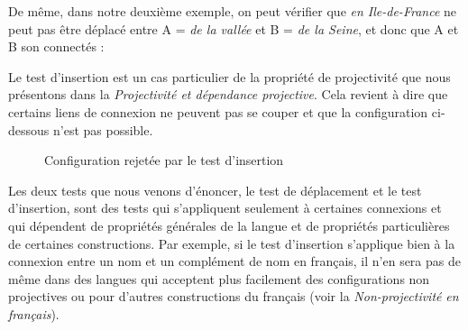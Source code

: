 De même, dans notre deuxième exemple, on peut vérifier que \textit{en Ile-de-France} ne peut pas être déplacé entre A = \textit{de la vallée} et B = \textit{de la Seine}, et donc que A et B son connectés :

\z
Le test d’insertion est un cas particulier de la propriété de projectivité que nous présentons dans la  \textit{Projectivité et dépendance projective}. Cela revient à dire que certains liens de connexion ne peuvent pas se couper et que la configuration ci-dessous n’est pas possible.

\begin{figure}
\caption{\label{fig:}Configuration rejetée par le test d’insertion}
\end{figure}

Les deux tests que nous venons d’énoncer, le test de déplacement et le test d’insertion, sont des tests qui s’appliquent seulement à certaines connexions et qui dépendent de propriétés générales de la langue et de propriétés particulières de certaines constructions. Par exemple, si le test d’insertion s’applique bien à la connexion entre un nom et un complément de nom en français, il n’en sera pas de même dans des langues qui acceptent plus facilement des configurations non projectives ou pour d’autres constructions du français (voir la  \textit{Non-projectivité} \textit{en français}).

